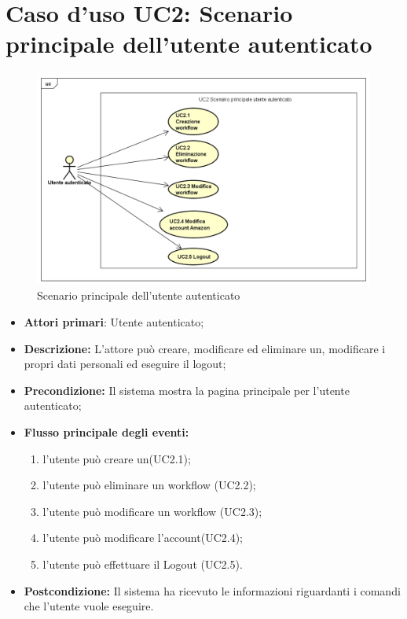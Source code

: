 		\section{Caso d'uso UC2: Scenario principale dell'utente autenticato}
		\begin{figure} [h]
			\centering
			\includegraphics[scale=0.4]{./Diagram/UC2.png}
			\caption{Scenario principale dell'utente autenticato }\label{}
		\end{figure}
		\begin{itemize}
			\item \textbf{Attori primari}: Utente autenticato;
			\item \textbf{Descrizione:} L'attore può creare, modificare ed eliminare un, modificare i propri dati personali ed eseguire il logout;
			\item \textbf{Precondizione:} Il sistema mostra la pagina principale per l'utente autenticato;
			\item \textbf{Flusso principale degli eventi:}
			\begin{enumerate}
				\item l'utente può creare un(UC2.1);
				\item l'utente può eliminare un workflow (UC2.2);
				\item l'utente può modificare un workflow (UC2.3);
				\item l'utente può modificare l'account(UC2.4);
				\item l'utente può effettuare il Logout (UC2.5).
			\end{enumerate}
			\item \textbf{Postcondizione:} Il sistema ha ricevuto le informazioni riguardanti i comandi che l'utente vuole eseguire.
		\end{itemize}
